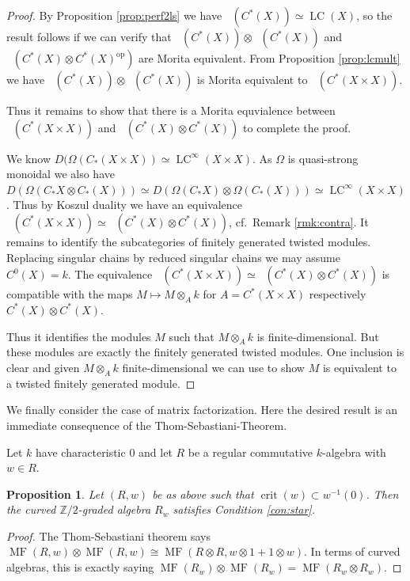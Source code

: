 \documentclass[a4paper]{amsart}
\theoremstyle{plain}
\newtheorem{prop}[thm]{Proposition}
\theoremstyle{definition}
\theoremstyle{remark}
\newcommand{\Z}{\mathbb{Z}}
\DeclareMathOperator{\MF}{MF}
\DeclareMathOperator{\Dctr}{D^{ctr}}
\DeclareMathOperator{\PerfII}{Perf^{\mathrm{II}}}
\DeclareMathOperator{\LC}{LC}
\newcommand{\op}{\mathrm{op}}
\numberwithin{equation}{section}
\theoremstyle{plain}
\begin{document}
	\begin{proof}
		By Proposition \ref{prop:perf2ls} we have $\PerfII(C^*(X)) \simeq \LC(X)$, so the result follows if we can verify that
		$\PerfII(C^*(X))\otimes \PerfII(C^*(X)) $ and $\PerfII(C^*(X) \otimes C^*(X)^{\op})$ are Morita equivalent.		
		From Proposition \ref{prop:lcmult} we have $\PerfII(C^*(X)) \otimes \PerfII(C^*(X))$ is Morita equivalent to $\PerfII(C^*(X\times X))$.
		
Thus it remains to show that there is a Morita equvialence between $\PerfII( C^*(X \times X)) $ and $\PerfII(C^*(X)  \otimes C^*(X))$ to complete the proof.
		
		We know $D(\Omega(C_*(X \times X)) \simeq \LC^\infty(X \times X)$. 
		 As $\Omega$ is quasi-strong monoidal \cite{holstein2025enriched} we also have $D(\Omega (C_*X \otimes C_*(X))) \simeq D(\Omega(C_*X) \otimes \Omega(C_*(X))) \simeq \LC^\infty(X\times X)$.
		Thus by Koszul duality we have an equivalence
		$\Dctr(C^*(X \times X)) \simeq \Dctr(C^*(X) \otimes C^*(X))$, cf.\ Remark \ref{rmk:contra}. 
		It remains to identify the subcategories of finitely generated twisted modules.
		Replacing singular chains by reduced singular chains we may assume $C^0(X) = k$.
		The equivalence $\Dctr(C^*(X \times X)) \simeq \Dctr(C^*(X) \otimes C^*(X))$ is compatible with the maps $M \mapsto M \otimes_A k$ for $A = C^*(X\times X)$ respectively $C^*(X)\otimes C^*(X)$. 
		
		Thus it identifies the modules $M$ such that $M \otimes_A k$ is finite-dimensional. But these modules are exactly the finitely generated twisted modules.
		One inclusion is clear and given $M \otimes_A k$ finite-dimensional we can use \cite[Proposition 6.4]{Holstein5} to show $M$ is equivalent to a twisted finitely generated module.		
	\end{proof}

We finally consider the case of matrix factorization. Here the desired result is an immediate consequence of the Thom-Sebastiani-Theorem.

		Let $k$ have characteristic 0 and let $R$ be a regular commutative $k$-algebra with $w \in R$.
		
	\begin{prop}
	Let $(R,w)$ be as above  such that $\operatorname{crit}(w) \subset w^{-1}(0)$. Then the curved $\Z/2$-graded algebra $R_w$  satisfies Condition \ref{con:star}.
	\end{prop}
	\begin{proof}
		The Thom-Sebastiani theorem \cite[Theorem 4.1.3]{Preygel11} says 
		$\MF(R, w) \otimes \MF(R, w) \cong \MF(R \otimes R, w \otimes 1 + 1\otimes w)$. In terms of curved algebras, this is exactly saying $\MF(R_w) \otimes \MF(R_w) = \MF(R_w \otimes R_w)$. 
	\end{proof}
	
\end{document}
